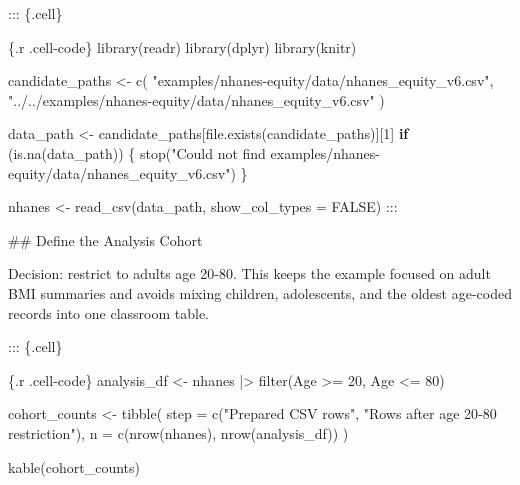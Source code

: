 \documentclass[
  letterpaper,
  DIV=11,
  numbers=noendperiod,
  oneside]{scrreprt}
\newenvironment{Shaded}{\begin{snugshade}}{\end{snugshade}}
\newcommand{\AttributeTok}[1]{\textcolor[rgb]{0.40,0.45,0.13}{#1}}
\newcommand{\ConstantTok}[1]{\textcolor[rgb]{0.56,0.35,0.01}{#1}}
\newcommand{\ControlFlowTok}[1]{\textcolor[rgb]{0.00,0.23,0.31}{\textbf{#1}}}
\newcommand{\DecValTok}[1]{\textcolor[rgb]{0.68,0.00,0.00}{#1}}
\newcommand{\FunctionTok}[1]{\textcolor[rgb]{0.28,0.35,0.67}{#1}}
\newcommand{\InformationTok}[1]{\textcolor[rgb]{0.37,0.37,0.37}{#1}}
\newcommand{\NormalTok}[1]{\textcolor[rgb]{0.00,0.23,0.31}{#1}}
\newcommand{\OtherTok}[1]{\textcolor[rgb]{0.00,0.23,0.31}{#1}}
\newcommand{\SpecialCharTok}[1]{\textcolor[rgb]{0.37,0.37,0.37}{#1}}
\newcommand{\StringTok}[1]{\textcolor[rgb]{0.13,0.47,0.30}{#1}}
\begin{document}
\begin{Shaded}
\begin{Highlighting}[numbers=left,,]
\NormalTok{::: \{.cell\}}

\InformationTok{\textasciigrave{}\textasciigrave{}\textasciigrave{}\{.r .cell{-}code\}}
\FunctionTok{library}\NormalTok{(readr)}
\FunctionTok{library}\NormalTok{(dplyr)}
\FunctionTok{library}\NormalTok{(knitr)}

\NormalTok{candidate\_paths }\OtherTok{\textless{}{-}} \FunctionTok{c}\NormalTok{(}
  \StringTok{"examples/nhanes{-}equity/data/nhanes\_equity\_v6.csv"}\NormalTok{,}
  \StringTok{"../../examples/nhanes{-}equity/data/nhanes\_equity\_v6.csv"}
\NormalTok{)}

\NormalTok{data\_path }\OtherTok{\textless{}{-}}\NormalTok{ candidate\_paths[}\FunctionTok{file.exists}\NormalTok{(candidate\_paths)][}\DecValTok{1}\NormalTok{]}
\ControlFlowTok{if}\NormalTok{ (}\FunctionTok{is.na}\NormalTok{(data\_path)) \{}
  \FunctionTok{stop}\NormalTok{(}\StringTok{"Could not find examples/nhanes{-}equity/data/nhanes\_equity\_v6.csv"}\NormalTok{)}
\NormalTok{\}}

\NormalTok{nhanes }\OtherTok{\textless{}{-}} \FunctionTok{read\_csv}\NormalTok{(data\_path, }\AttributeTok{show\_col\_types =} \ConstantTok{FALSE}\NormalTok{)}
\InformationTok{\textasciigrave{}\textasciigrave{}\textasciigrave{}}
\NormalTok{:::}


\FunctionTok{\#\# Define the Analysis Cohort}

\NormalTok{Decision: restrict to adults age 20{-}80. This keeps the example focused on adult BMI summaries and avoids mixing children, adolescents, and the oldest age{-}coded records into one classroom table.}


\NormalTok{::: \{.cell\}}

\InformationTok{\textasciigrave{}\textasciigrave{}\textasciigrave{}\{.r .cell{-}code\}}
\NormalTok{analysis\_df }\OtherTok{\textless{}{-}}\NormalTok{ nhanes }\SpecialCharTok{|\textgreater{}}
  \FunctionTok{filter}\NormalTok{(Age }\SpecialCharTok{\textgreater{}=} \DecValTok{20}\NormalTok{, Age }\SpecialCharTok{\textless{}=} \DecValTok{80}\NormalTok{)}

\NormalTok{cohort\_counts }\OtherTok{\textless{}{-}} \FunctionTok{tibble}\NormalTok{(}
  \AttributeTok{step =} \FunctionTok{c}\NormalTok{(}\StringTok{"Prepared CSV rows"}\NormalTok{, }\StringTok{"Rows after age 20{-}80 restriction"}\NormalTok{),}
  \AttributeTok{n =} \FunctionTok{c}\NormalTok{(}\FunctionTok{nrow}\NormalTok{(nhanes), }\FunctionTok{nrow}\NormalTok{(analysis\_df))}
\NormalTok{)}

\FunctionTok{kable}\NormalTok{(cohort\_counts)}
\InformationTok{\textasciigrave{}\textasciigrave{}\textasciigrave{}}


\end{Highlighting}
\end{Shaded}
\end{document}
